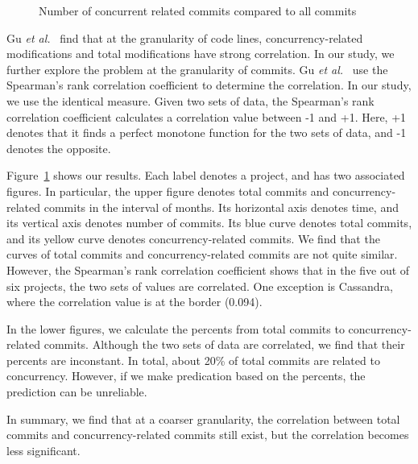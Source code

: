\begin{figure}
	\caption{Number of concurrent related commits compared to all commits}
	\label{fig:confidence}
\end{figure}

Gu \emph{et al.}~\cite{conf/sigsoft/GuJSZL15} find that at the granularity of code lines, concurrency-related modifications and total modifications have strong correlation. In our study, we further explore the problem at the granularity of commits. Gu \emph{et al.}~\cite{conf/sigsoft/GuJSZL15} use the Spearman's rank
correlation coefficient to determine the correlation. In our study, we use the identical measure. Given two sets of data, the Spearman's rank
correlation coefficient calculates a correlation value between -1 and +1. Here, +1 denotes that it finds a perfect monotone function for the two sets of data, and -1 denotes the opposite.

Figure~\ref{fig:confidence} shows our results. Each label denotes a project, and has two associated figures. In particular, the upper figure denotes total commits and concurrency-related commits in the interval of months. Its horizontal axis denotes time, and its vertical axis denotes number of commits. Its blue curve denotes total commits, and its yellow curve denotes concurrency-related commits. We find that the curves of total commits and concurrency-related commits are not quite similar. However, the Spearman's rank
correlation coefficient shows that in the five out of six projects, the two sets of values are correlated. One exception is Cassandra, where the correlation value is at the border (0.094).

In the lower figures, we calculate the percents from total commits to concurrency-related commits. Although the two sets of data are correlated, we find that their percents are inconstant. In total, about 20\% of total commits are related to concurrency. However, if we make predication based on the percents, the prediction can be unreliable.

In summary, we find that at a coarser granularity, the correlation between total commits and concurrency-related commits still exist, but the correlation becomes less significant.

